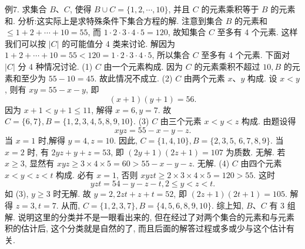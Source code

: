 例7. 求集合 $B 、 C$, 使得 $B \cup C=\{1,2, \cdots, 10\}$, 并且 $C$ 的元素乘积等于 $B$ 的元素和.
分析:这实际上是求特殊条件下集合方程的解.
注意到集合 $B$ 的元素和 $\leqslant 1+2+\cdots+10=55$, 而 $1 \cdot 2 \cdot 3 \cdot 4 \cdot 5=120$, 故知集合 $C$ 至多有 4 个元素.
这样我们可以按 $|C|$ 的可能值分 4 类来讨论.
解因为 $1+2+\cdots+10=55<120=1 \cdot 2 \cdot 3 \cdot 4 \cdot 5$, 所以集合 $C$ 至多有 4 个元素.
下面对 $|C|$ 分 4 种情况讨论.
(1) $C$ 由一个元素构成.
因为 $C$ 的元素乘积不超过 $10, B$ 的元素和至少为 $55-10=45$. 故此情况不成立.
(2) $C$ 由两个元素 $x 、 y$ 构成.
设 $x<y$, 则有 $x y=55-x-y$, 即
$$
(x+1)(y+1)=56 .
$$
因为 $x+1<y+1 \leqslant 11$, 解得 $x=6, y=7$. 故 $C=\{6,7\}, B=\{1,2,3,4,5,8,9,10\}$.
(3) $C$ 由三个元素 $x<y<z$ 构成.
由题设得
$$
x y z=55-x-y-z .
$$
当 $x=1$ 时,解得 $y=4, z=10$. 因此, $C=\{1,4,10\}, B=\{2,3,5$, $6,7,8,9\}$.
当 $x=2$ 时, 有 $2 y z+y+z=53$, 即 $(2 y+1)(2 z+1)=107$ 为质数.
无解.
若 $x \geqslant 3$, 显然有 $x y z \geqslant 3 \times 4 \times 5=60>55-x-y-z$. 无解.
(4) $C$ 由四个元素 $x<y<z<t$ 构成.
必有 $x=1$, 否则 $x y z t \geqslant 2 \times 3 \times 4 \times 5=120>55$. 这时
$$
y z t=54-y-z-t, 2 \leqslant y<z<t .
$$
如 (3), $y \geqslant 3$ 时无解.
故 $y=2,2 z t+z+t=52$, 即 $(2 z+1)(2 t+1)= 105$. 解得 $z=3, t=7$. 从而, $C=\{1,2,3,7\}, B=\{4,5,6,8,9,10\}$.
综上知, $B 、 C$ 有 3 组解.
说明这里的分类并不是一眼看出来的, 但在经过了对两个集合的元素和与元素积的估计后, 这个分类就是自然的了, 而且后面的解答过程或多或少与这个估计有关.




